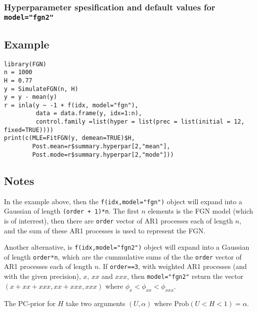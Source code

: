 \documentclass[a4paper,11pt]{article}
\begin{document}
\subsubsection*{Hyperparameter spesification and default values for \texttt{model="fgn2"}}


\subsection*{Example}

\begin{verbatim}
library(FGN)
n = 1000
H = 0.77
y = SimulateFGN(n, H)
y = y - mean(y)
r = inla(y ~ -1 + f(idx, model="fgn"), 
         data = data.frame(y, idx=1:n),
         control.family =list(hyper = list(prec = list(initial = 12, fixed=TRUE))))
print(c(MLE=FitFGN(y, demean=TRUE)$H,
        Post.mean=r$summary.hyperpar[2,"mean"],
        Post.mode=r$summary.hyperpar[2,"mode"]))
\end{verbatim}


\subsection*{Notes}

In the example above, then the \texttt{f(idx,model="fgn")} object will
expand into a Gaussian of length \texttt{(order + 1)*n}. The first $n$
elements is the FGN model (which is of interrest), then there are
\texttt{order} vector of AR1 processes each of length $n$, and the sum
of these AR1 processes is used to represent the FGN.

Another alternative, is \texttt{f(idx,model="fgn2")} object will
expand into a Gaussian of length \texttt{order*n}, which are the
cummulative sums of the the \texttt{order} vector of AR1 processes
each of length $n$. If \texttt{order==3}, with weighted AR1 processes
(and with the given precision), $x$, $xx$ and $xxx$, then
\texttt{model="fgn2"} return the vector $(x+xx+xxx, xx+xxx, xxx)$
where $\phi_{x} < \phi_{xx} < \phi_{xxx}$.



The PC-prior for $H$ take two arguments $(U, \alpha)$ where
$\text{Prob}(U < H < 1) = \alpha$.
\end{document}
